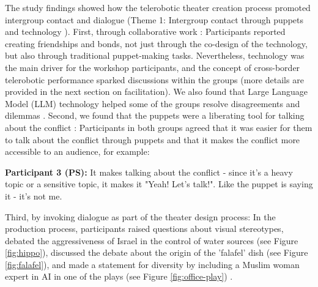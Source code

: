\documentclass[dissertation,math,vertlayout,pdfa,colorlinks]{aaltoseries}
\begin{document}
The study findings showed how the telerobotic theater creation process promoted intergroup contact and dialogue (Theme 1: Intergroup contact through puppets and technology \cite[p. 14]{peledTeleroboticTheaterOppressed2025}). First, through collaborative work \cite[p. 14]{peledTeleroboticTheaterOppressed2025}: Participants reported creating friendships and bonds, not just through the co-design of the technology, but also through traditional puppet-making tasks. Nevertheless, technology was the main driver for the workshop participants, and the concept of cross-border telerobotic performance sparked discussions within the groups (more details are provided in the next section on facilitation). We also found that Large Language Model (LLM) technology helped some of the groups resolve disagreements and dilemmas \cite[p. 22]{peledTeleroboticTheaterOppressed2025}. Second, we found that the puppets were a liberating tool for talking about the conflict \cite[p. 13]{peledTeleroboticTheaterOppressed2025}: Participants in both groups agreed that it was easier for them to talk about the conflict through puppets and that it makes the conflict more accessible to an audience, for example:
\begin{displayquote}
    \textbf{Participant 3 (PS):} It makes talking about the conflict - since it's a heavy topic or a sensitive topic, it makes it "Yeah! Let's talk!". Like the puppet is saying it -  it's not me.
\end{displayquote}
Third, by invoking dialogue as part of the theater design process: In the production process, participants raised questions about visual stereotypes, debated the aggressiveness of Israel in the control of water sources (see Figure \ref{fig:hippo}), discussed the debate about the origin of the 'falafel' dish (see Figure \ref{fig:falafel}), and made a statement for diversity by including a Muslim woman expert in AI in one of the plays (see Figure \ref{fig:office-play}) \cite[p. 14]{peledTeleroboticTheaterOppressed2025}.
\end{document}
